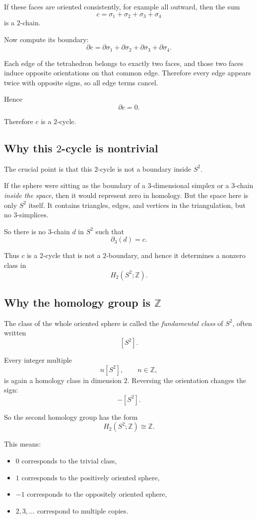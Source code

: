 \documentclass[12pt,a4paper]{article}
\newcommand{\Z}{\mathbb{Z}}
\theoremstyle{notespace}
\begin{document}
If these faces are oriented consistently, for example all outward, then the sum
\[
c=\sigma_1+\sigma_2+\sigma_3+\sigma_4
\]
is a \(2\)-chain.

Now compute its boundary:
\[
\partial c
=
\partial\sigma_1+\partial\sigma_2+\partial\sigma_3+\partial\sigma_4.
\]

Each edge of the tetrahedron belongs to exactly two faces, and those two faces induce opposite orientations on that common edge. Therefore every edge appears twice with opposite signs, so all edge terms cancel.

Hence
\[
\partial c=0.
\]

Therefore \(c\) is a \(2\)-cycle.

\subsection{Why this \(2\)-cycle is nontrivial}

The crucial point is that this \(2\)-cycle is not a boundary inside \(S^2\).

If the sphere were sitting as the boundary of a \(3\)-dimensional simplex or a \(3\)-chain \emph{inside the space}, then it would represent zero in homology. But the space here is only \(S^2\) itself. It contains triangles, edges, and vertices in the triangulation, but no \(3\)-simplices.

So there is no \(3\)-chain \(d\) in \(S^2\) such that
\[
\partial_3(d)=c.
\]

Thus \(c\) is a \(2\)-cycle that is not a \(2\)-boundary, and hence it determines a nonzero class in
\[
H_2(S^2;\Z).
\]

\subsection{Why the homology group is \(\Z\)}

The class of the whole oriented sphere is called the \emph{fundamental class} of \(S^2\), often written
\[
[S^2].
\]

Every integer multiple
\[
n[S^2],\qquad n\in \Z,
\]
is again a homology class in dimension \(2\). Reversing the orientation changes the sign:
\[
-[S^2].
\]

So the second homology group has the form
\[
H_2(S^2;\Z)\cong \Z.
\]

This means:
\begin{itemize}
	\item \(0\) corresponds to the trivial class,
	\item \(1\) corresponds to the positively oriented sphere,
	\item \(-1\) corresponds to the oppositely oriented sphere,
	\item \(2,3,\dots\) correspond to multiple copies.
\end{itemize}
\end{document}
